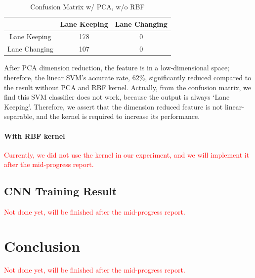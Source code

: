 \documentclass[10pt,twocolumn,letterpaper]{article}
\begin{document}
\begin{table}
	\caption{Confusion Matrix w/ PCA, w/o RBF}
	\label{tb:cm2}
	\begin{tabular}{|c|c|c|}
	\hline
	& Lane Keeping & Lane Changing \\
	\hline
	Lane Keeping & 178 & 0 \\
	\hline
	Lane Changing & 107 & 0 \\
	\hline
\end{tabular}
\end{table}

After PCA dimension reduction, the feature is in a low-dimensional space; therefore, the linear SVM's accurate rate, $62\%$, significantly reduced compared to the result without PCA and RBF kernel. Actually, from the confusion matrix, we find this SVM classifier does not work, because the output is always `Lane Keeping'. Therefore, we assert that the dimension reduced feature is not linear-separable, and the kernel is required to increase its performance.

\paragraph{With RBF kernel}

\textcolor{red}{Currently, we did not use the kernel in our experiment, and we will implement it after the mid-progress report.}

\subsection{CNN Training Result}

\textcolor{red}{Not done yet, will be finished after the mid-progress report.}

\section{Conclusion}

\textcolor{red}{Not done yet, will be finished after the mid-progress report.}


{\small


}
\end{document}
